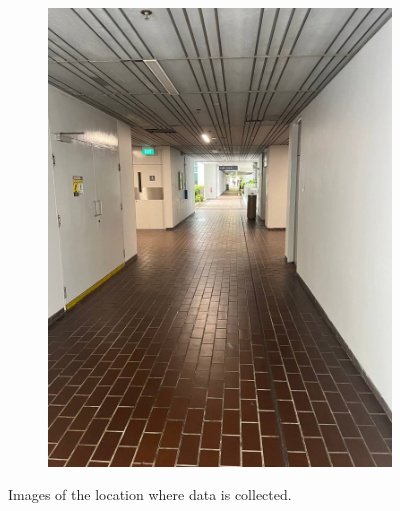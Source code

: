 \documentclass[12pt]{report}
\begin{document}
\begin{figure}[h]
\begin{subfigure}[b]{0.19\textwidth}
        \includegraphics[width=\textwidth]{walking-area-5}
    \end{subfigure}
    \caption{Images of the location where data is collected.}
\end{figure}
\end{document}
